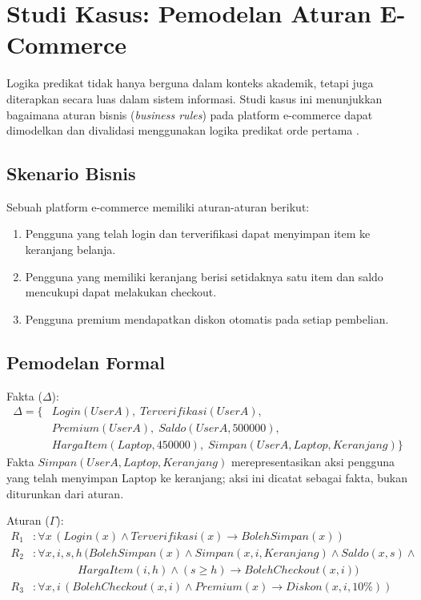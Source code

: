 \section{Studi Kasus: Pemodelan Aturan E-Commerce}

Logika predikat tidak hanya berguna dalam konteks akademik, tetapi juga diterapkan secara luas dalam sistem informasi. Studi kasus ini menunjukkan bagaimana aturan bisnis (\textit{business rules}) pada platform e-commerce dapat dimodelkan dan divalidasi menggunakan logika predikat orde pertama \cite{rosen2019}.

\subsection{Skenario Bisnis}

Sebuah platform e-commerce memiliki aturan-aturan berikut:
\begin{enumerate}
    \item Pengguna yang telah login dan terverifikasi dapat menyimpan item ke keranjang belanja.
    \item Pengguna yang memiliki keranjang berisi setidaknya satu item dan saldo mencukupi dapat melakukan checkout.
    \item Pengguna premium mendapatkan diskon otomatis pada setiap pembelian.
\end{enumerate}

\subsection{Pemodelan Formal}

Fakta ($\Delta$):
\begin{align*}
\Delta = \{ & Login(UserA), \; Terverifikasi(UserA), \\
            & Premium(UserA), \; Saldo(UserA, 500000), \\
            & HargaItem(Laptop, 450000), \; Simpan(UserA, Laptop, Keranjang) \}
\end{align*}
Fakta $Simpan(UserA, Laptop, Keranjang)$ merepresentasikan aksi pengguna yang telah menyimpan Laptop ke keranjang; aksi ini dicatat sebagai fakta, bukan diturunkan dari aturan.

Aturan ($\Gamma$):
\begin{align*}
R_1&: \forall x\, (Login(x) \wedge Terverifikasi(x) \rightarrow BolehSimpan(x)) \\
R_2&: \forall x, i, s, h\, (BolehSimpan(x) \wedge Simpan(x, i, Keranjang) \wedge Saldo(x, s) \wedge \\
    & \qquad\qquad HargaItem(i, h) \wedge (s \geq h) \rightarrow BolehCheckout(x, i)) \\
R_3&: \forall x, i\, (BolehCheckout(x, i) \wedge Premium(x) \rightarrow Diskon(x, i, 10\%))
\end{align*}

